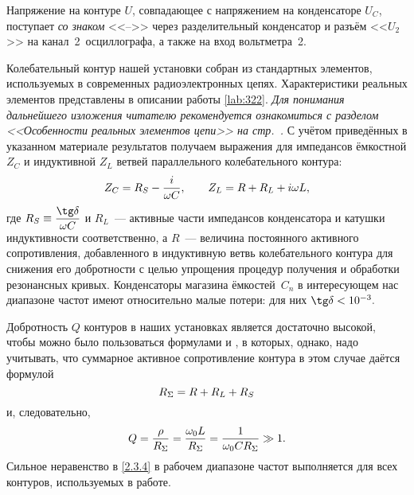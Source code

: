 Напряжение на контуре $U$, совпадающее с напряжением на конденсаторе $U_C$,
поступает \emph{со знаком} <<$–$>> через разделительный конденсатор и разъём
<<${U}_2$>> на канал~2~осциллографа, а также на вход вольтметра~2.


Колебательный контур нашей установки собран из стандартных элементов,
используемых в современных радиоэлектронных цепях. Характеристики реальных элементов
представлены в описании работы \ref{lab:322}. \emph{Для понимания дальнейшего
изложения читателю рекомендуется ознакомиться с разделом
<<Особенности реальных элементов цепи>> на стр.~\pageref{par:real_elements}.} 
С учётом приведённых в указанном материале результатов получаем выражения
для импедансов ёмкостной $Z_C$ и индуктивной $Z_L$ ветвей параллельного 
колебательного контура:
\begin{equation}\eqmark{2.3.2}
	Z_C=R_S-\dfrac{i}{\omega C}, \qquad Z_L=R+R_L+i\omega L,
\end{equation}
где $R_S\equiv\dfrac{\tg\delta}{\omega C}$ и $R_L$~--- активные части
импедансов конденсатора и катушки индуктивности соответственно, а $R$~--- величина
постоянного активного сопротивления, добавленного в индуктивную ветвь
колебательного контура для снижения его добротности с целью упрощения  процедур
получения и обработки резонансных кривых. 
Конденсаторы магазина ёмкостей~$C_n$ в интересующем нас диапазоне
частот имеют относительно малые потери: для них $\tg\delta<10^{-3}.$

Добротность $Q$ контуров в наших установках является достаточно высокой, чтобы
можно было пользоваться формулами  и , в
которых, однако, надо учитывать, что суммарное активное сопротивление контура в
этом случае даётся формулой
\begin{equation}\eqmark{2.3.3}
	R_{\Sigma}=R+R_L+R_S
\end{equation}
и, следовательно,
\begin{equation}\eqmark{2.3.4}
	Q=\frac{\rho}{R_{\Sigma}}=
    \frac{\omega_0 L}{R_{\Sigma}}=
    \frac{1}{\omega_0 CR_{\Sigma}} \gg 1.
\end{equation}
Сильное неравенство в \eqref{2.3.4} в рабочем диапазоне частот выполняется для
всех контуров, используемых в работе.

